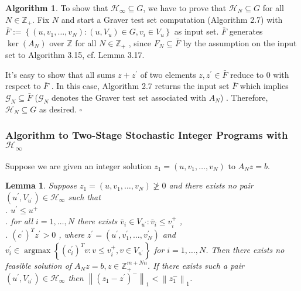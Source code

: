 \documentclass{article}
\theoremstyle{plain}
\newtheorem{lemma}[theorem]{Lemma}
\theoremstyle{definition}
\newtheorem{algorithm}[theorem]{Algorithm}
\begin{document}
\begin{algorithm}
To show that  $\mathcal{H}_{\infty} \subseteq G $, we have to prove that  $\mathcal{H}_{N} \subseteq G$  for all  $N \in \mathbb{Z}_{+} $. Fix  $N$  and start a Graver test set computation (Algorithm 2.7) with  $\bar{F}:=\left\{\left(u, v_{1}, \ldots, v_{N}\right):\left(u, V_{u}\right) \in G, v_{i} \in V_{u}\right\}$  as input set.  $\bar{F}$  generates  $\operatorname{ker}\left(A_{N}\right)$  over  $\mathbb{Z}$  for all  $N \in \mathbb{Z}_{+}$ , since $ F_{N} \subseteq \bar{F}$  by the assumption on the input set to Algorithm 3.15, cf. Lemma 3.17.

It's easy to show that all sums  $z+z^{\prime}$  of two elements  $z, z^{\prime} \in \bar{F}$  reduce to $0$ with respect to  $\bar{F}$ . In this case, Algorithm  2.7  returns the input set  $\bar{F}$  which implies  $\mathcal{G}_{N} \subseteq \bar{F}$  ($\mathcal{G}_{N} $ denotes the Graver test set associated with $A_N$) . Therefore,  $\mathcal{H}_{N} \subseteq G$  as desired.  \hfill$\square$

\subsubsection{Algorithm to Two-Stage Stochastic Integer Programs with $\mathcal{H}_{\infty}$}
Suppose we are given an integer solution  $z_{1}=\left(u, v_{1}, \ldots, v_{N}\right) \text { to } A_{N} z=b$. \\

\begin{lemma} Suppose  $z_{1}=\left(u, v_{1}, \ldots, v_{N}\right) \ngeq 0$  and there exists no pair  $\left(u^{\prime}, V_{u^{\prime}}\right) \in \mathcal{H}_{\infty}$  such that \\
.  $u^{\prime} \leq u^{+}$  \\
. for all  $i=1, \ldots, N$ there exists $ \bar{v}_{i} \in V_{u^{\prime}}: \bar{v}_{i} \leq v_{i}^{+}$ ,\\
.  $\left(c^{\prime}\right)^{T} z^{\prime}>0$ , where  $z^{\prime}=\left(u^{\prime}, v_{1}^{\prime}, \ldots, v_{N}^{\prime}\right)$  and  $v_{i}^{\prime} \in \operatorname{argmax}\left\{\left(c_{i}^{\prime}\right)^{T} v: v \leq v_{i}^{+}, v \in V_{u^{\prime}}\right\}$  for $ i=1, \ldots, N $.
Then there exists no feasible solution of  $A_{N} z=b, z \in \mathbb{Z}_{+}^{m+N n}$. If there exists such a pair  $\left(u^{\prime}, V_{u^{\prime}}\right) \in \mathcal{H}_{\infty}$  then  $\left\|\left(z_{1}-z^{\prime}\right)^{-}\right\|_{1}<\left\|z_{1}^{-}\right\|_{1}$. \end{lemma}


\end{algorithm}
\end{document}
